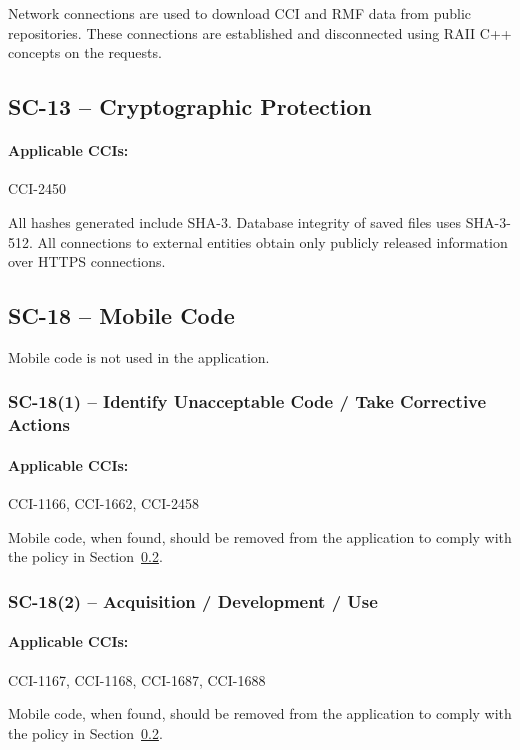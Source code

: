 \documentclass[letterpaper, 10pt, twoside]{article}
\begin{document}
Network connections are used to download CCI and RMF data from public repositories. These connections are established and disconnected using RAII C++ concepts on the requests.

\subsection{SC-13 -- Cryptographic Protection}

\paragraph{Applicable CCIs:} CCI-2450

All hashes generated include SHA-3. Database integrity of saved files uses SHA-3-512. All connections to external entities obtain only publicly released information over HTTPS connections.

\subsection{SC-18 -- Mobile Code}
\label{sec:sc-18}

Mobile code is not used in the application.

\subsubsection{SC-18(1) -- Identify Unacceptable Code / Take Corrective Actions}

\paragraph{Applicable CCIs:} CCI-1166, CCI-1662, CCI-2458

Mobile code, when found, should be removed from the application to comply with the policy in Section~\ref{sec:sc-18}.

\subsubsection{SC-18(2) -- Acquisition / Development / Use}

\paragraph{Applicable CCIs:} CCI-1167, CCI-1168, CCI-1687, CCI-1688

Mobile code, when found, should be removed from the application to comply with the policy in Section~\ref{sec:sc-18}.
\end{document}
